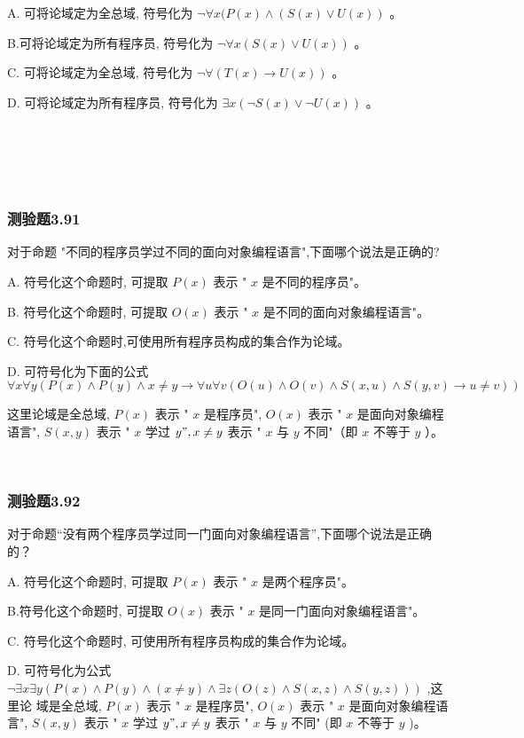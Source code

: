\documentclass[UTF8, heading=true]{ctexart}
\begin{document}
A. 可将论域定为全总域, 符号化为 $\neg \forall x(P(x) \wedge(S(x) \vee U(x))$ 。

B.可将论域定为所有程序员, 符号化为 $\neg \forall x(S(x) \vee U(x))$ 。

C. 可将论域定为全总域, 符号化为 $\neg \forall(T(x) \rightarrow U(x))$ 。

D. 可将论域定为所有程序员, 符号化为 $\exists x(\neg S(x) \vee \neg U(x))$ 。

\textcolor{white}{答案：B}

\textcolor{white}{解析：对于A选项,等价于“并非(对所有$x$,如果$P(x)$,那么$S(x) \vee U(x)$)”（教材P109页末）因此符号化为$\neg \forall x(P(x) \rightarrow (S(x) \vee U(x)))$。}

\subsubsection{测验题3.91}

对于命题 "不同的程序员学过不同的面向对象编程语言",下面哪个说法是正确的?

A. 符号化这个命题时, 可提取 $P(x)$ 表示 " $x$ 是不同的程序员"。

B.  符号化这个命题时, 可提取 $O(x)$ 表示 " $x$ 是不同的面向对象编程语言"。

C.   符号化这个命题时,可使用所有程序员构成的集合作为论域。

D. 
可符号化为下面的公式
$$
\forall x \forall y(P(x) \wedge P(y) \wedge x \neq y \rightarrow \forall u \forall v(O(u) \wedge O(v) \wedge S(x, u) \wedge S(y, v) \rightarrow u \neq v))
$$

这里论域是全总域, $P(x)$ 表示 " $x$ 是程序员", $O(x)$ 表示 " $x$ 是面向对象编程语言", $S(x, y)$ 表示 " $x$ 学过 $y ", x \neq y$ 表示 " $x$ 与 $y$ 不同"（即 $x$ 不等于 $y$ ）。


\textcolor{white}{答案：D}

\subsubsection{测验题3.92}

对于命题“没有两个程序员学过同一门面向对象编程语言”,下面哪个说法是正确的？

A. 符号化这个命题时, 可提取 $P(x)$ 表示 " $x$ 是两个程序员"。

B.符号化这个命题时, 可提取 $O(x)$ 表示 " $x$ 是同一门面向对象编程语言"。

C. 符号化这个命题时, 可使用所有程序员构成的集合作为论域。

D. 可符号化为公式 $\neg \exists x \exists y(P(x) \wedge P(y) \wedge(x \neq y) \wedge \exists z(O(z) \wedge S(x, z) \wedge S(y, z)))$ ,这里论
域是全总域, $P(x)$ 表示 " $x$ 是程序员", $O(x)$ 表示 " $x$ 是面向对象编程语言", $S(x, y)$ 表示 " $x$ 学过 $y ", x \neq y$ 表示 " $x$ 与 $y$ 不同" (即 $x$ 不等于 $y$ )。
\end{document}

